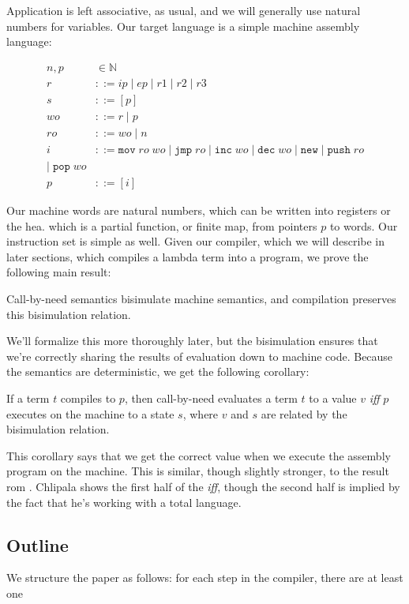 Application is left associative, as usual, and we will generally use natural
numbers for variables. Our target language is a simple machine assembly
language:

\begin{align}
  \tag{Word}   n, p &\in \mathbb{N} \\
  \tag{Registers} r &::= ip \; | \; ep \; | \; r1 \; | \; r2 \; | \; r3 \\
  \tag{Stack}     s &::= [p] \\
  \tag{Write Operands}  wo &::= r \; | \; p \\
  \tag{Read Operands}  ro &::= wo \; | \; n \\
  \tag{Instructions} i &::= \texttt{mov} \; ro \; wo \; 
                       | \; \texttt{jmp} \; ro \; 
                       | \; \texttt{inc} \; wo \;
                       | \; \texttt{dec} \; wo \;
                       | \; \texttt{new} \;  
                       | \; \texttt{push} \; ro \\
                       | \; \texttt{pop} \; wo \\
  \tag{Program}   p &::= [i]
\end{align}

Our machine words are natural numbers, which can be written into registers or
the hea. which is a partial function, or finite map, from pointers $p$ to
words. Our instruction set is simple as well. Given our compiler, which we will
describe in later sections, which compiles a lambda term into a program, we
prove the following main result:

\begin{theorem}
Call-by-need semantics bisimulate machine semantics, and compilation
preserves this bisimulation relation.
\end{theorem}

We'll formalize this more thoroughly later, but the bisimulation ensures that
we're correctly sharing the results of evaluation down to machine code. Because
the semantics are deterministic, we get the following corollary:   

\begin{corollary}
If a term $t$ compiles to $p$, then call-by-need evaluates a term $t$ to a value
$v$ \emph{iff} $p$ executes on the machine to a state $s$, where $v$ and $s$ are
related by the bisimulation relation.
\end{corollary}

This corollary says that we get the correct value when we execute the assembly
program on the machine. This is similar, though slightly stronger, to the result
rom \cite{chlipala2007certified}. Chlipala shows the first half of the
\emph{iff}, though the second half is implied by the fact that he's working with
a total language.

\subsection{Outline}
We structure the paper as follows: for each step in the compiler, there are at
least one 

